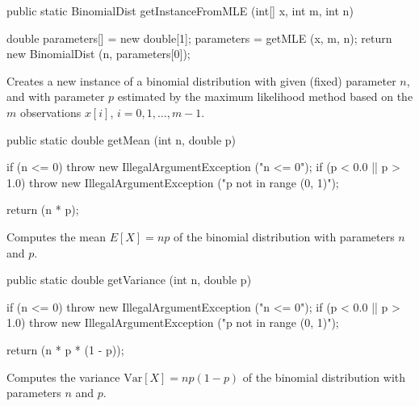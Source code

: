 \begin{code}

   public static BinomialDist getInstanceFromMLE (int[] x, int m, int n)\begin{hide} {
      double parameters[] = new double[1];
      parameters = getMLE (x, m, n);
      return new BinomialDist (n, parameters[0]);
   }\end{hide}
\end{code}
\begin{tabb}
   Creates a new instance of a binomial distribution with given (fixed) parameter $n$, and
   with parameter ${p}$ estimated by the maximum likelihood method based on the
   $m$ observations $x[i]$, $i = 0, 1, \ldots, m-1$.
\end{tabb}
\begin{htmlonly}
\end{htmlonly}
\begin{code}

   public static double getMean (int n, double p)\begin{hide} {
      if (n <= 0)
         throw new IllegalArgumentException ("n <= 0");
      if (p < 0.0 || p > 1.0)
         throw new IllegalArgumentException ("p not in range (0, 1)");

      return (n * p);
   }\end{hide}
\end{code}
\begin{tabb}  Computes the mean $E[X] = np$ of the binomial distribution with
   parameters $n$ and $p$.
\end{tabb}
\begin{htmlonly}
\end{htmlonly}
\begin{code}

   public static double getVariance (int n, double p)\begin{hide} {
      if (n <= 0)
         throw new IllegalArgumentException ("n <= 0");
      if (p < 0.0 || p > 1.0)
         throw new IllegalArgumentException ("p not in range (0, 1)");

      return (n * p * (1 - p));
   }\end{hide}
\end{code}
\begin{tabb}  Computes the variance $\mbox{Var}[X] = np(1 - p)$ of the binomial
   distribution with parameters $n$ and $p$.
\end{tabb}
